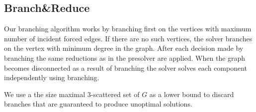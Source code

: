 \documentclass[a4paper,UKenglish,cleveref, autoref, thm-restate]{lipics-v2021}
\begin{document}
\subsection{Branch\&Reduce}
Our branching algorithm works by branching first on the vertices with maximum number of incident forced edges. 
If there are no such vertices, the solver branches on the vertex with minimum degree in the graph.
After each decision made by branching the same reductions as in the presolver are applied.
When the graph becomes disconnected as a result of branching the solver solves each component independently using branching.

We use a the size maximal $3$-scattered set of $G$ as a lower bound to discard branches that are guaranteed to produce unoptimal solutions. 





\appendix
\end{document}

